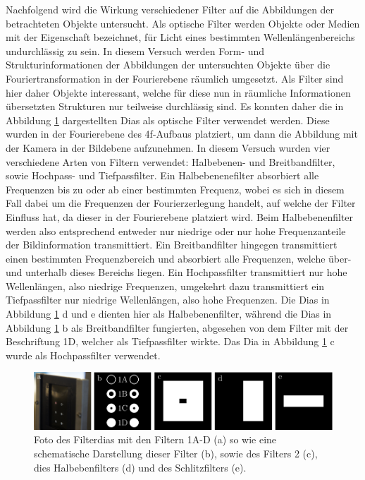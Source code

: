 Nachfolgend wird die Wirkung verschiedener Filter auf die Abbildungen der betrachteten Objekte untersucht. Als optische Filter werden Objekte oder Medien mit der Eigenschaft bezeichnet, für Licht eines bestimmten Wellenlängenbereichs undurchlässig zu sein. In diesem Versuch werden Form- und Strukturinformationen der Abbildungen der untersuchten Objekte über die Fouriertransformation in der Fourierebene räumlich umgesetzt. Als Filter sind hier daher Objekte interessant, welche für diese nun in räumliche Informationen übersetzten Strukturen nur teilweise durchlässig sind. Es konnten daher die in Abbildung \ref{fig:filter} dargestellten Dias als optische Filter verwendet werden. Diese wurden in der Fourierebene des 4f-Aufbaus platziert, um dann die Abbildung mit der Kamera in der Bildebene aufzunehmen.
In diesem Versuch wurden vier verschiedene Arten von Filtern verwendet: Halbebenen- und Breitbandfilter, sowie Hochpass- und Tiefpassfilter. Ein Halbebenenefilter absorbiert alle Frequenzen bis zu oder ab einer bestimmten Frequenz, wobei es sich in diesem Fall dabei um die Frequenzen der Fourierzerlegung handelt, auf welche der Filter Einfluss hat, da dieser in der Fourierebene platziert wird. Beim Halbebenenfilter werden also entsprechend entweder nur niedrige oder nur hohe Frequenzanteile der Bildinformation transmittiert. Ein Breitbandfilter hingegen transmittiert einen bestimmten Frequenzbereich und absorbiert alle Frequenzen, welche über- und unterhalb dieses Bereichs liegen. Ein Hochpassfilter transmittiert nur hohe Wellenlängen, also niedrige Frequenzen, umgekehrt dazu transmittiert ein Tiefpassfilter nur niedrige Wellenlängen, also hohe Frequenzen. Die Dias in Abbildung \ref{fig:filter} d und e dienten hier als Halbebenenfilter, während die Dias in Abbildung \ref{fig:filter} b als Breitbandfilter fungierten, abgesehen von dem Filter mit der Beschriftung 1D, welcher als Tiefpassfilter wirkte. Das Dia in Abbildung \ref{fig:filter} c wurde als Hochpassfilter verwendet. 


\begin{figure}[h]
	\centering
	\includegraphics{images/filter/abb.pdf}
	\caption[Verwendete Filter]{
		Foto des Filterdias mit den Filtern 1A-D (a) so wie eine schematische Darstellung dieser Filter (b), sowie des Filters 2 (c), dies Halbebenfilters (d) und des Schlitzfilters (e).
	}
	\label{fig:filter}
\end{figure}


